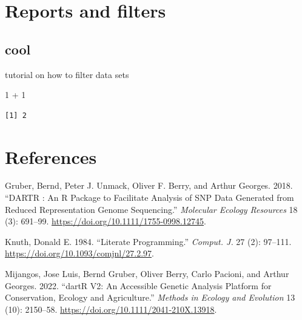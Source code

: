\documentclass[
  letterpaper,
  DIV=11,
  numbers=noendperiod]{scrreprt}
\newenvironment{Shaded}{\begin{snugshade}}{\end{snugshade}}
\newcommand{\DecValTok}[1]{\textcolor[rgb]{0.25,0.63,0.44}{#1}}
\newcommand{\SpecialCharTok}[1]{\textcolor[rgb]{0.25,0.44,0.63}{#1}}
\newlength{\cslhangindent}
\newlength{\cslentryspacingunit} %
\newenvironment{CSLReferences}[2] %
 {%
  \setlength{\parindent}{0pt}
  \ifodd #1
  \let\oldpar\par
  \def\par{\hangindent=\cslhangindent\oldpar}
  \fi
  \setlength{\parskip}{#2\cslentryspacingunit}
 }%
 {}
\begin{document}

\hypertarget{reports-and-filters}{%
\chapter{Reports and filters}\label{reports-and-filters}}

\hypertarget{cool}{%
\section{cool}\label{cool}}

tutorial on how to filter data sets

\begin{Shaded}
\begin{Highlighting}[]
\DecValTok{1} \SpecialCharTok{+} \DecValTok{1}
\end{Highlighting}
\end{Shaded}

\begin{verbatim}
[1] 2
\end{verbatim}


\hypertarget{references-1}{%
\chapter*{References}\label{references-1}}


\hypertarget{refs}{}
\begin{CSLReferences}{1}{0}
\leavevmode{}%
Gruber, Bernd, Peter J. Unmack, Oliver F. Berry, and Arthur Georges.
2018. {``{DARTR} : {An} {R} Package to Facilitate Analysis of {SNP} Data
Generated from Reduced Representation Genome Sequencing.''}
\emph{Molecular Ecology Resources} 18 (3): 691--99.
\url{https://doi.org/10.1111/1755-0998.12745}.

\leavevmode{}%
Knuth, Donald E. 1984. {``Literate Programming.''} \emph{Comput. J.} 27
(2): 97--111. \url{https://doi.org/10.1093/comjnl/27.2.97}.

\leavevmode{}%
Mijangos, Jose Luis, Bernd Gruber, Oliver Berry, Carlo Pacioni, and
Arthur Georges. 2022. {``{dartR} V2: {An} Accessible Genetic Analysis
Platform for Conservation, Ecology and Agriculture.''} \emph{Methods in
Ecology and Evolution} 13 (10): 2150--58.
\url{https://doi.org/10.1111/2041-210X.13918}.

\end{CSLReferences}
\end{document}
